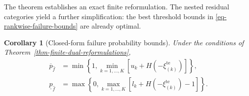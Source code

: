 \documentclass[review,11pt,3p,authoryear,nopreprintline]{elsarticle}
\newtheorem{corollary}{Corollary}
\begin{document}
The theorem establishes an exact finite reformulation. The nested residual categories yield a further simplification: the best threshold bounds in \eqref{eq-rankwise-failure-bounds} are already optimal.

\begin{corollary}[Closed-form failure probability bounds]
  \label{thm-closed-form-bounds}
  Under the conditions of Theorem~\ref{thm-finite-dual-reformulations},
  \begin{align}
    \overline p_{\hat f}
    &=\min\left\{1,\min_{k=1,\ldots,K}[u_k+H\left(-\xi_{(k)}^{\mathrm{te}}\right)]\right\},
    \label{eq-dw-closed-upper}\\
    \underline p_{\hat f}
    &=\max\left\{0,\max_{k=1,\ldots,K}[l_k+H\left(-\xi_{(k)}^{\mathrm{te}}\right)-1]\right\}.
    \label{eq-dw-closed-lower}
  \end{align}
\end{corollary}
\end{document}
